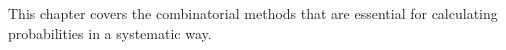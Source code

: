 This chapter covers the combinatorial methods that are essential for calculating probabilities in a systematic way.
